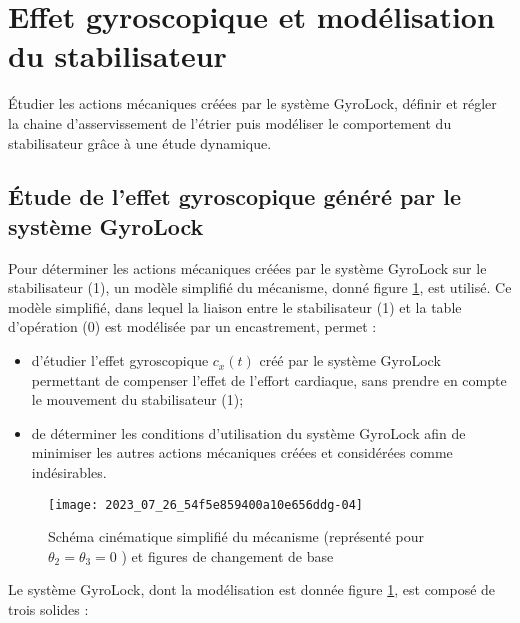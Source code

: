 
\section{Effet gyroscopique et modélisation du stabilisateur}
\begin{obj}
Étudier les actions mécaniques créées par le système GyroLock, définir et régler la chaine d'asservissement de l'étrier puis modéliser le comportement du stabilisateur grâce à une étude dynamique.
\end{obj}

\subsection{\label{sec:IIA} Étude de l'effet gyroscopique généré par le système GyroLock}
Pour déterminer les actions mécaniques créées par le système GyroLock sur le stabilisateur (1), un modèle simplifié du mécanisme, donné figure \ref{fig:06}, est utilisé. Ce modèle simplifié, dans lequel la liaison entre le stabilisateur (1) et la table d'opération (0) est modélisée par un encastrement, permet :

\begin{itemize}
  \item d'étudier l'effet gyroscopique $c_{x}(t)$ créé par le système GyroLock permettant de compenser l'effet de l'effort cardiaque, sans prendre en compte le mouvement du stabilisateur (1);

  \item de déterminer les conditions d'utilisation du système GyroLock afin de minimiser les autres actions mécaniques créées et considérées comme indésirables.
\end{itemize}


\begin{figure}[!h]
\centering
\texttt{[image: 2023\_07\_26\_54f5e859400a10e656ddg-04]}
\caption{\label{fig:06}Schéma cinématique simplifié du mécanisme (représenté pour $\theta_{2}=\theta_{3}=0$ ) et figures de changement de base}
\end{figure}


Le système GyroLock, dont la modélisation est donnée figure \ref{fig:06}, est composé de trois solides :

